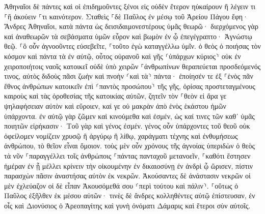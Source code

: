 \documentclass[twoside, 9pt]{extreport}
\begin{document}
Ἀθηναῖοι δὲ πάντες καὶ οἱ ἐπιδημοῦντες ξένοι εἰς οὐδὲν ἕτερον ηὐκαίρουν ἢ λέγειν τι ⸀ἢ ἀκούειν ⸀τι καινότερον. 
Σταθεὶς ⸀δὲ Παῦλος ἐν μέσῳ τοῦ Ἀρείου Πάγου ἔφη· Ἄνδρες Ἀθηναῖοι, κατὰ πάντα ὡς δεισιδαιμονεστέρους ὑμᾶς θεωρῶ· 
διερχόμενος γὰρ καὶ ἀναθεωρῶν τὰ σεβάσματα ὑμῶν εὗρον καὶ βωμὸν ἐν ᾧ ἐπεγέγραπτο· Ἀγνώστῳ θεῷ. ⸀ὃ οὖν ἀγνοοῦντες εὐσεβεῖτε, ⸀τοῦτο ἐγὼ καταγγέλλω ὑμῖν. 
ὁ θεὸς ὁ ποιήσας τὸν κόσμον καὶ πάντα τὰ ἐν αὐτῷ, οὗτος οὐρανοῦ καὶ γῆς ⸂ὑπάρχων κύριος⸃ οὐκ ἐν χειροποιήτοις ναοῖς κατοικεῖ 
οὐδὲ ὑπὸ χειρῶν ⸀ἀνθρωπίνων θεραπεύεται προσδεόμενός τινος, αὐτὸς διδοὺς πᾶσι ζωὴν καὶ πνοὴν ⸂καὶ τὰ⸃ πάντα· 
ἐποίησέν τε ἐξ ⸀ἑνὸς πᾶν ἔθνος ἀνθρώπων κατοικεῖν ἐπὶ ⸂παντὸς προσώπου⸃ τῆς γῆς, ὁρίσας προστεταγμένους καιροὺς καὶ τὰς ὁροθεσίας τῆς κατοικίας αὐτῶν, 
ζητεῖν τὸν ⸀θεὸν εἰ ἄρα γε ψηλαφήσειαν αὐτὸν καὶ εὕροιεν, καί γε οὐ μακρὰν ἀπὸ ἑνὸς ἑκάστου ἡμῶν ὑπάρχοντα. 
ἐν αὐτῷ γὰρ ζῶμεν καὶ κινούμεθα καὶ ἐσμέν, ὡς καί τινες τῶν καθ᾽ ὑμᾶς ποιητῶν εἰρήκασιν· Τοῦ γὰρ καὶ γένος ἐσμέν. 
γένος οὖν ὑπάρχοντες τοῦ θεοῦ οὐκ ὀφείλομεν νομίζειν χρυσῷ ἢ ἀργύρῳ ἢ λίθῳ, χαράγματι τέχνης καὶ ἐνθυμήσεως ἀνθρώπου, τὸ θεῖον εἶναι ὅμοιον. 
τοὺς μὲν οὖν χρόνους τῆς ἀγνοίας ὑπεριδὼν ὁ θεὸς τὰ νῦν ⸀παραγγέλλει τοῖς ἀνθρώποις ⸀πάντας πανταχοῦ μετανοεῖν, 
⸀καθότι ἔστησεν ἡμέραν ἐν ᾗ μέλλει κρίνειν τὴν οἰκουμένην ἐν δικαιοσύνῃ ἐν ἀνδρὶ ᾧ ὥρισεν, πίστιν παρασχὼν πᾶσιν ἀναστήσας αὐτὸν ἐκ νεκρῶν. 
Ἀκούσαντες δὲ ἀνάστασιν νεκρῶν οἱ μὲν ἐχλεύαζον οἱ δὲ εἶπαν Ἀκουσόμεθά σου ⸂περὶ τούτου καὶ πάλιν⸃. 
⸀οὕτως ὁ Παῦλος ἐξῆλθεν ἐκ μέσου αὐτῶν· 
τινὲς δὲ ἄνδρες κολληθέντες αὐτῷ ἐπίστευσαν, ἐν οἷς καὶ Διονύσιος ὁ Ἀρεοπαγίτης καὶ γυνὴ ὀνόματι Δάμαρις καὶ ἕτεροι σὺν αὐτοῖς. 
\end{document}
